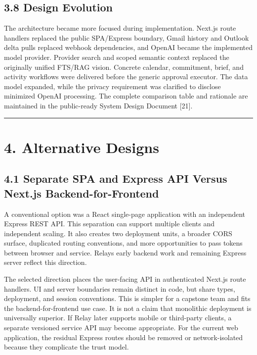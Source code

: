\documentclass[
]{report}
\begin{document}
\section{3.8 Design Evolution}\label{38-design-evolution}

The architecture became more focused during implementation. Next.js
route handlers replaced the public SPA/Express boundary, Gmail history
and Outlook delta pulls replaced webhook dependencies, and OpenAI became
the implemented model provider. Provider search and scoped semantic
context replaced the originally unified FTS/RAG vision. Concrete
calendar, commitment, brief, and activity workflows were delivered
before the generic approval executor. The data model expanded, while the
privacy requirement was clarified to disclose minimized OpenAI
processing. The complete comparison table and rationale are maintained
in the public-ready System Design Document {[}21{]}.

\begin{center}\rule{0.5\linewidth}{0.5pt}\end{center}

\chapter{4. Alternative Designs}\label{4-alternative-designs}

\section{4.1 Separate SPA and Express API Versus Next.js
Backend-for-Frontend}\label{41-separate-spa-and-express-api-versus-nextjs-backend-for-frontend}

A conventional option was a React single-page application with an
independent Express REST API. This separation can support multiple
clients and independent scaling. It also creates two deployment units, a
broader CORS surface, duplicated routing conventions, and more
opportunities to pass tokens between browser and service.
Relay\textquotesingle s early backend work and remaining Express server
reflect this direction.

The selected direction places the user-facing API in authenticated
Next.js route handlers. UI and server boundaries remain distinct in
code, but share types, deployment, and session conventions. This is
simpler for a capstone team and fits the backend-for-frontend use case.
It is not a claim that monolithic deployment is universally superior. If
Relay later supports mobile or third-party clients, a separate versioned
service API may become appropriate. For the current web application, the
residual Express routes should be removed or network-isolated because
they complicate the trust model.
\end{document}
